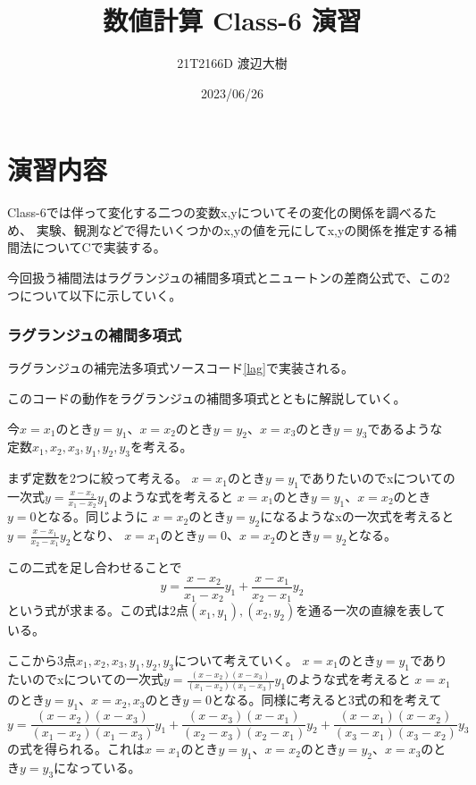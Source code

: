 \documentclass[a4paper,11pt,dvipdfmx]{jsarticle}
\begin{document}

\title{数値計算 Class-6 演習}
\author{21T2166D 渡辺大樹}
\date{2023/06/26}
\maketitle

\section{演習内容}
Class-6では伴って変化する二つの変数x,yについてその変化の関係を調べるため、
実験、観測などで得たいくつかのx,yの値を元にしてx,yの関係を推定する補間法についてCで実装する。

今回扱う補間法はラグランジュの補間多項式とニュートンの差商公式で、この2つについて以下に示していく。
\subsubsection{ラグランジュの補間多項式}
ラグランジュの補完法多項式ソースコード\ref{lag}で実装される。


このコードの動作をラグランジュの補間多項式とともに解説していく。

今$x=x_1$のとき$y=y_1$、$x=x_2$のとき$y=y_2$、$x=x_3$のとき$y=y_3$であるような
定数$x_1,x_2,x_3,y_1,y_2,y_3$を考える。

まず定数を2つに絞って考える。
$x=x_1$のとき$y=y_1$でありたいのでxについての一次式$y=\frac{x-x_2}{x_1-x_2}y_1$のような式を考えると
$x=x_1$のとき$y=y_1$、$x=x_2$のとき$y=0$となる。同じように
$x=x_2$のとき$y=y_2$になるようなxの一次式を考えると$y=\frac{x-x_1}{x_2-x_1}y_2$となり、
$x=x_1$のとき$y=0$、$x=x_2$のとき$y=y_2$となる。

この二式を足し合わせることで
\begin{equation*}
    y=\frac{x-x_2}{x_1-x_2}y_1 + \frac{x-x_1}{x_2-x_1}y_2
\end{equation*}
という式が求まる。この式は2点$(x_1,y_1),(x_2,y_2)$を通る一次の直線を表している。

ここから3点$x_1,x_2,x_3,y_1,y_2,y_3$について考えていく。
$x=x_1$のとき$y=y_1$でありたいのでxについての一次式$y=\frac{(x-x_2)(x-x_3)}{(x_1-x_2)(x_1-x_3)}y_1$のような式を考えると
$x=x_1$のとき$y=y_1$、$x=x_2,x_3$のとき$y=0$となる。同様に考えると3式の和を考えて
\begin{equation*}
    y=\frac{(x-x_2)(x-x_3)}{(x_1-x_2)(x_1-x_3)}y_1 + \frac{(x-x_3)(x-x_1)}{(x_2-x_3)(x_2-x_1)}y_2 + \frac{(x-x_1)(x-x_2)}{(x_3-x_1)(x_3-x_2)}y_3
\end{equation*}
の式を得られる。これは$x=x_1$のとき$y=y_1$、$x=x_2$のとき$y=y_2$、$x=x_3$のとき$y=y_3$になっている。
\end{document}
